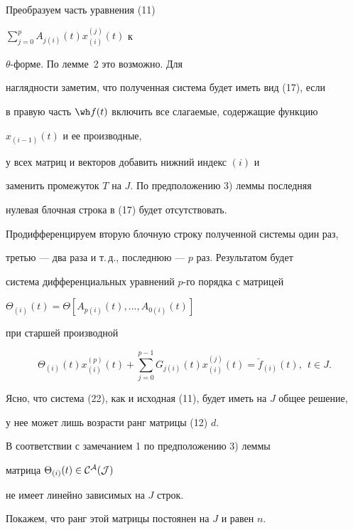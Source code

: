 \begin{pf}


Преобразуем часть уравнения (11)


$\sum\limits_{j=0}^{p}{A_{j(i)}(t)x_{(i)}^{(j)}(t)}$ к


$\theta$-форме. По лемме~2 это возможно. Для


наглядности заметим, что полученная система будет иметь вид (17), если


в правую часть $\wh f (t)$ включить все слагаемые, содержащие функцию


$x_{(i-1)}(t)$ и ее производные, 


у всех матриц и векторов добавить нижний индекс $(i)$ и


заменить промежуток $T$ на $J$. По предположению 3) леммы последняя


нулевая блочная строка в (17) будет отсутствовать.





Продифференцируем вторую блочную строку полученной системы один раз, 


третью --- два раза и т.\,д., последнюю --- $p$ раз. Результатом будет 


система дифференциальных уравнений $p$-го порядка с матрицей


$\Theta_{(i)}(t)=\Theta[A_{p(i)}(t), \dotsc, A_{0(i)}(t)]$


при старшей производной


\begin{equation}


\Theta_{(i)}(t)x_{(i)}^{(p)}(t)+


\sum_{j=0}^{p-1}{G_{j(i)}(t)x_{(i)}^{(j)}(t)}=


\breve f_{(i)}(t), \ \ t \in J.


\end{equation}


Ясно, что система (22), как и исходная (11), будет иметь на $J$ общее решение,


у нее может лишь возрасти ранг матрицы (12) $d$.





В соответствии с замечанием 1 по предположению 3) леммы


матрица $\Theta_{(i)}(t) \in \cal C^A(J)$


не имеет линейно зависимых на $J$ строк.


Покажем, что ранг этой матрицы постоянен на $J$ и равен $n$.



\end{pf}
